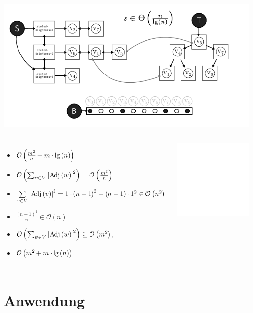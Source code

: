 \documentclass[xcolor=x11names,compress]{beamer}
\begin{document}
\begin{frame}
\begin{overprint}
\begin{center}
		\end{center}
		\begin{center}
			\includegraphics[scale=1.0]{img/execution/weirdtime/04.pdf}
		\end{center}
		\begin{columns}
			\begin{itemize}
				\item<5-6,11>[] \( \mathcal{O} \left( \frac{m^2}{n} + m \cdot \textnormal{lg} \left( n \right)\right) \)
				\item<6-9>[] \( \mathcal{O} \left( \sum_{w \in V} \left| \textnormal{Adj}\left( w\right) \right|^2 \right)  = \mathcal{O} \left( \frac{m^2}{n}\right)\)
				\item<8-9>[] \( \sum\limits_{v \in V} {\left| \textnormal{Adj}\left( v\right) \right|}^2 = 1 \cdot \left( n - 1 \right)^2 + \left( n - 1 \right) \cdot 1^2 \in \mathcal{O} \left( n^2 \right) \)
				\item<9>[] \( \frac{\left( n - 1 \right)^2}{n} \in \mathcal{O} \left( n \right) \)
				\item<10->[] \( \mathcal{O} \left( \sum_{w \in V} \left| \textnormal{Adj}\left( w\right) \right|^2 \right) \subseteq \mathcal{O} \left( m^2 \right), \)
				\item<11->[] \( \mathcal{O} \left( m^2 + m \cdot \textnormal{lg} \left( n \right)\right) \)
			\end{itemize}
			\begin{center}
				\includegraphics<7->[scale=1.0]{img/graph/stargraph.pdf}
			\end{center}
		\end{columns}
	\end{overprint}
\end{frame}
\egroup

\section{Anwendung}
\end{document}
